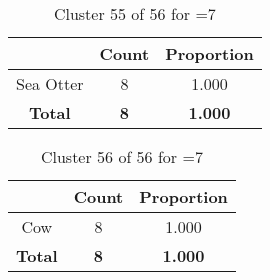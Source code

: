 \begin{table}[ht!]
\centering
\begin{tabular}{|c|c|c|}
\hline
\bf \Spec{} &\bf Count &\bf Proportion\\ \hline \hline
Sea Otter & 8 & 1.000\\ \hline
\hline
\bf Total & \bf 8 & \bf 1.000\\ \hline
\end{tabular}
\label{tab:cluster:55:7}
\caption{Cluster 55 of 56 for \minneigh{}=7}
\end{table}

\begin{table}[ht!]
\centering
\begin{tabular}{|c|c|c|}
\hline
\bf \Spec{} &\bf Count &\bf Proportion\\ \hline \hline
Cow & 8 & 1.000\\ \hline
\hline
\bf Total & \bf 8 & \bf 1.000\\ \hline
\end{tabular}
\label{tab:cluster:56:7}
\caption{Cluster 56 of 56 for \minneigh{}=7}
\end{table}

